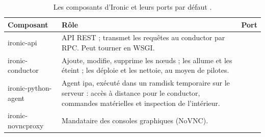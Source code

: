 \begin{table}[!ht]
\centering
\renewcommand{\arraystretch}{1.3}
\begin{tabular}{@{}>{\raggedright\arraybackslash\ttfamily\small}p{3.6cm}>{\raggedright\arraybackslash}p{9.6cm}>{\raggedright\arraybackslash}p{2.3cm}@{}}
\toprule
\textrm{\textbf{Composant}} & \textbf{Rôle} & \textbf{Port} \\
\midrule
ironic-api & API REST ; transmet les requêtes au conductor par RPC. Peut tourner en WSGI. & 6385 \\
ironic-conductor & Ajoute, modifie, supprime les nœuds ; les allume et les éteint ; les déploie et les nettoie, au moyen de pilotes. & \\
ironic-python-agent & Agent \gls{ipa}, exécuté dans un \gls{ramdisk} temporaire sur le serveur : accès à distance pour le conductor, commandes matérielles et inspection de l'intérieur. & 9999 \\
ironic-novncproxy & Mandataire des consoles graphiques (NoVNC). & \\
\bottomrule
\end{tabular}
\caption{Les composants d'Ironic et leurs ports par défaut \parencite{ironic-overview,ironic-identity,ironic-tenant-networks}.}
\label{tab:ir-composants}
\end{table}

